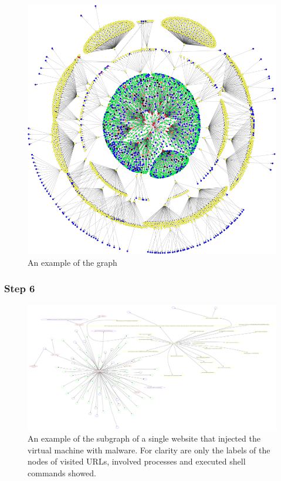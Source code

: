 \begin{figure}[h]
    \centering
    \includegraphics[width=17cm]{Images/graph2.png}
    \caption{An example of the graph}
    \label{fig:graph}
\end{figure}
\subsubsection{Step 6}
\begin{figure}[h]
    \centering
    \includegraphics[width=25cm, angle=90]{Images/report_Subprocess_from_tab}
    \caption{An example of the subgraph of a single website that injected the virtual machine with malware. For clarity are only the labels of the nodes of visited URLs, involved processes and executed shell commands showed.}
    \label{fig:subgraph}
\end{figure}

